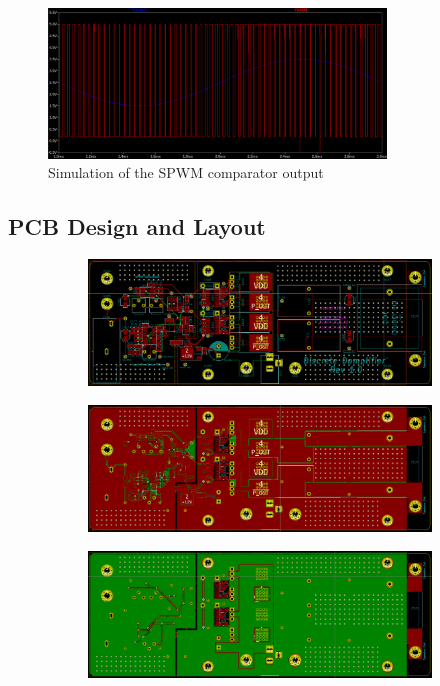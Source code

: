 \documentclass[a4paper,11pt]{article}
\begin{document}
\begin{figure}[h!]
    \centering
    \includegraphics[width=0.8\textwidth]{simulation/spwm_out.png}
    \caption{Simulation of the SPWM comparator output}
\end{figure}

\subsection{PCB Design and Layout}


\begin{figure}[h!]
    \centering
    \begin{subfigure}{0.8\textwidth}
        \includegraphics[width=\columnwidth]{pcb/traces.png}
        \subcaption{}
    \end{subfigure}
    \begin{subfigure}{0.8\textwidth}
        \includegraphics[width=\columnwidth]{pcb/top_layer.png}
        \subcaption{}
    \end{subfigure}
    \begin{subfigure}{0.8\textwidth}
        \includegraphics[width=\columnwidth]{pcb/bottom_layer.png}
        \subcaption{}
    \end{subfigure}
    \caption{}
\end{figure}
\end{document}
